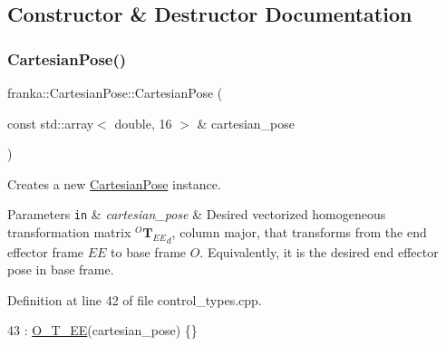 \subsection{Constructor \& Destructor Documentation}
\mbox{\label{classfranka_1_1CartesianPose_a5559a53a898f9b369b1df9d51f9351b5}} 
\subsubsection{\texorpdfstring{Cartesian\+Pose()}{CartesianPose()}\hspace{0.1cm}{\footnotesize\ttfamily [1/4]}}
{\footnotesize\ttfamily franka\+::\+Cartesian\+Pose\+::\+Cartesian\+Pose (\begin{DoxyParamCaption}\item[{const std\+::array$<$ double, 16 $>$ \&}]{cartesian\+\_\+pose }\end{DoxyParamCaption})\hspace{0.3cm}{\ttfamily [noexcept]}}

Creates a new \hyperlink{classfranka_1_1CartesianPose}{Cartesian\+Pose} instance.


\begin{DoxyParams}[1]{Parameters}
\mbox{\tt in}  & {\em cartesian\+\_\+pose} & Desired vectorized homogeneous transformation matrix $^O {\mathbf{T}_{EE}}_{d}$, column major, that transforms from the end effector frame $EE$ to base frame $O$. Equivalently, it is the desired end effector pose in base frame. \\
\hline
\end{DoxyParams}


Definition at line 42 of file control\+\_\+types.\+cpp.


\begin{DoxyCode}
43     : \hyperlink{classfranka_1_1CartesianPose_a406e53e3d8fe594a11888f516eb4bf7d}{O\_T\_EE}(cartesian\_pose) \{\}
\end{DoxyCode}
\mbox{\label{classfranka_1_1CartesianPose_a17272cb33af9aa4b726fa96b31cf0101}} 
